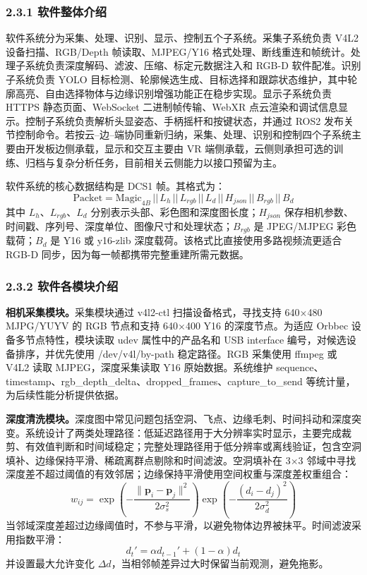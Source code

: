 \documentclass[UTF8,a4paper,zihao=-4]{ctexart}
\begin{document}
\subsubsection*{2.3.1 软件整体介绍}

软件系统分为采集、处理、识别、显示、控制五个子系统。采集子系统负责 V4L2 设备扫描、RGB/Depth 帧读取、MJPEG/Y16 格式处理、断线重连和帧统计。处理子系统负责深度解码、滤波、压缩、标定元数据注入和 RGB-D 软件配准。识别子系统负责 YOLO 目标检测、轮廓候选生成、目标选择和跟踪状态维护，其中轮廓高亮、自由选择物体与边缘识别增强功能正在稳步实现。显示子系统负责 HTTPS 静态页面、WebSocket 二进制帧传输、WebXR 点云渲染和调试信息显示。控制子系统负责解析头显姿态、手柄摇杆和按键状态，并通过 ROS2 发布关节控制命令。若按云--边--端协同重新归纳，采集、处理、识别和控制四个子系统主要由开发板边侧承载，显示和交互主要由 VR 端侧承载，云侧则承担可选的训练、归档与复杂分析任务，目前相关云侧能力以接口预留为主。

软件系统的核心数据结构是 DCS1 帧。其格式为：
\[
\text{Packet}=\text{Magic}_{4B}\,||\,L_h\,||\,L_{rgb}\,||\,L_d\,||\,H_{json}\,||\,B_{rgb}\,||\,B_d
\]
其中 $L_h$、$L_{rgb}$、$L_d$ 分别表示头部、彩色图和深度图长度；$H_{json}$ 保存相机参数、时间戳、序列号、深度单位、图像尺寸和处理状态；$B_{rgb}$ 是 JPEG/MJPEG 彩色载荷；$B_d$ 是 Y16 或 y16-zlib 深度载荷。该格式比直接使用多路视频流更适合 RGB-D 同步，因为每一帧都携带完整重建所需元数据。

\subsubsection*{2.3.2 软件各模块介绍}

\textbf{相机采集模块。}采集模块通过 v4l2-ctl 扫描设备格式，寻找支持 640$\times$480 MJPG/YUYV 的 RGB 节点和支持 640$\times$400 Y16 的深度节点。为适应 Orbbec 设备多节点特性，模块读取 udev 属性中的产品名和 USB interface 编号，对候选设备排序，并优先使用 /dev/v4l/by-path 稳定路径。RGB 采集使用 ffmpeg 或 V4L2 读取 MJPEG，深度采集读取 Y16 原始数据。系统维护 sequence、timestamp、rgb\_depth\_delta、dropped\_frames、capture\_to\_send 等统计量，为后续性能分析提供依据。

\textbf{深度清洗模块。}深度图中常见问题包括空洞、飞点、边缘毛刺、时间抖动和深度突变。系统设计了两类处理路径：低延迟路径用于大分辨率实时显示，主要完成裁剪、有效值判断和时间域稳定；完整处理路径用于低分辨率或离线验证，包含空洞填补、边缘保持平滑、稀疏离群点剔除和时间滤波。空洞填补在 3$\times$3 邻域中寻找深度差不超过阈值的有效邻居；边缘保持平滑使用空间权重与深度差权重组合：
\[
w_{ij}=\exp\left(-\frac{\|\mathbf{p}_i-\mathbf{p}_j\|^2}{2\sigma_s^2}\right)\exp\left(-\frac{(d_i-d_j)^2}{2\sigma_d^2}\right)
\]
当邻域深度差超过边缘阈值时，不参与平滑，以避免物体边界被抹平。时间滤波采用指数平滑：
\[
d_t'=\alpha d_{t-1}'+(1-\alpha)d_t
\]
并设置最大允许变化 $\Delta d$，当相邻帧差异过大时保留当前观测，避免拖影。
\end{document}
